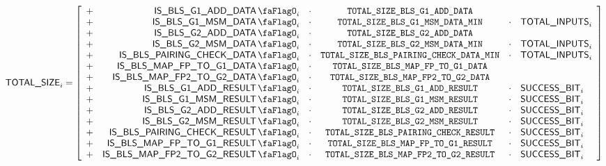 \[
    \blsTotalSize _{i}
    =
    \left[ \begin{array}{crcccl}
        + & \isBlsGOneAddData  _{i} & \cdot & \totalSizeBlsGOneAddData    \\
        + & \isBlsGOneMsmData  _{i} & \cdot & \totalSizeBlsGOneMsmDataMin & \cdot & \totalInputs      _{i} \\
        + & \isBlsGTwoAddData  _{i} & \cdot & \totalSizeBlsGTwoAddData    \\
        + & \isBlsGTwoMsmData  _{i} & \cdot & \totalSizeBlsGTwoMsmDataMin & \cdot & \totalInputs      _{i} \\
        + & \isBlsPairingCheckData _{i} & \cdot & \totalSizeBlsPairingCheckDataMin & \cdot & \totalInputs _{i} \\
        + & \isBlsMapFpToGOneData _{i} & \cdot & \totalSizeBlsMapFpToGOneData \\
        + & \isBlsMapFpTwoToGTwoData _{i} & \cdot & \totalSizeBlsMapFpTwoToGTwoData \\
        + & \isBlsGOneAddResult _{i} & \cdot & \totalSizeBlsGOneAddResult & \cdot & \blsSuccessBit _{i} \\
        + & \isBlsGOneMsmResult _{i} & \cdot & \totalSizeBlsGOneMsmResult & \cdot & \blsSuccessBit _{i} \\
        + & \isBlsGTwoAddResult _{i} & \cdot & \totalSizeBlsGTwoAddResult & \cdot & \blsSuccessBit _{i} \\
        + & \isBlsGTwoMsmResult _{i} & \cdot & \totalSizeBlsGTwoMsmResult & \cdot & \blsSuccessBit _{i} \\
        + & \isBlsPairingCheckResult _{i} & \cdot & \totalSizeBlsPairingCheckResult & \cdot & \blsSuccessBit _{i} \\
        + & \isBlsMapFpToGOneResult _{i} & \cdot & \totalSizeBlsMapFpToGOneResult & \cdot & \blsSuccessBit _{i} \\
        + & \isBlsMapFpTwoToGTwoResult _{i} & \cdot & \totalSizeBlsMapFpTwoToGTwoResult & \cdot & \blsSuccessBit _{i} \\
    \end{array} \right]
\]

